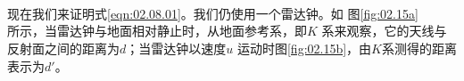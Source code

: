 \begin{figure}[!b]
  \centering
   \\ \vspace{-0.3em}
   \\ \vspace{-0.3em}
   \\ \vspace{-0.3em}
  \caption{}
  \label{fig:02.15}
\end{figure}
现在我们来证明式\eqref{eqn:02.08.01}。我们仍使用一个雷达钟。如
图\ref{fig:02.15a}\\所示，当雷达钟与地面相对静止时，从地面参考系，即$K$
系来观察，它的天线与反射面之间的距离为$ d$；当雷达钟以速度$u$
运动时\lbr 图\ref{fig:02.15b}\rbr ，由$K$系测得的距离表示为$d'$。

